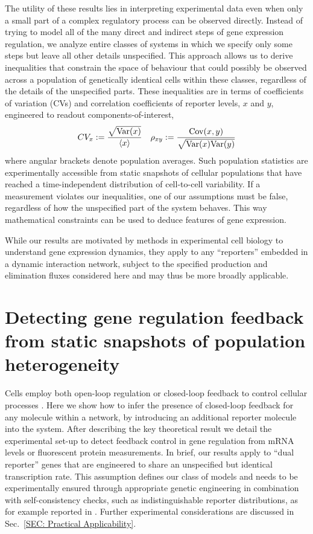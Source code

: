 \documentclass[%
 reprint,prx,
superscriptaddress,
%
%
%
%
%
%
%
%
%
 amsmath,amssymb,
 aps,
%
%
%
%
%
%
]{revtex4-2}
\newcommand{\lb}{\langle}
\newcommand{\rb}{\rangle}
\begin{document}
{The utility of these results lies in interpreting experimental data even when only a small part of a complex regulatory process can be observed directly. 
%
Instead of trying to model all of the many direct and indirect steps of gene expression regulation, we analyze entire classes of systems in which we specify only some steps but leave all other details unspecified. 
This approach allows us to derive inequalities that constrain the space of behaviour that could possibly be observed across a population of genetically identical cells within these classes, regardless of the details of the unspecified parts. 
These inequalities are in terms of coefficients of variation (CVs) and correlation coefficients of reporter levels, $x$ and $y$, engineered to readout components-of-interest, 
\begin{equation*}
CV_x: = \frac{\sqrt{\Var(x)}}{\lb x\rb} \quad 
\rho_{xy}:=\frac{\Cov(x,y)}{\sqrt{\Var(x)\Var(y)}}
\end{equation*}
where angular brackets denote population averages. 
%
Such population statistics are experimentally accessible from static snapshots of cellular populations that have reached a time-independent distribution of cell-to-cell variability. If a measurement violates our inequalities, one of our assumptions must be false, regardless of how the unspecified part of the system behaves. This way mathematical constraints can be used to deduce features of gene expression.}
%

While our results are motivated by methods in experimental cell biology to understand gene expression dynamics, they apply to any ``reporters'' embedded in a dynamic interaction network, subject to the specified production and elimination fluxes considered here and may thus be more broadly applicable.

\section{Detecting gene regulation feedback from static snapshots of population heterogeneity}
\vspace{-1em}
Cells employ both open-loop regulation or closed-loop feedback to control cellular processes \cite{shen2002network}. Here we show how to infer the presence of closed-loop feedback for any molecule within a network, by introducing an additional reporter molecule into the system. After describing the key theoretical result we detail the experimental set-up to detect feedback control in gene regulation from mRNA levels or fluorescent protein measurements. {In brief, our results apply to ``dual reporter'' genes that are engineered to share an unspecified but identical transcription rate. This assumption defines our class of models and needs to be experimentally ensured through appropriate genetic engineering in combination with self-consistency checks, such as indistinguishable reporter distributions, as for example reported in \cite{Raser2004, Bar-Even2006, Elowitz2002, baudrimont2019contribution}. Further experimental considerations are discussed in Sec.~\ref{SEC: Practical Applicability}}.
\end{document}
